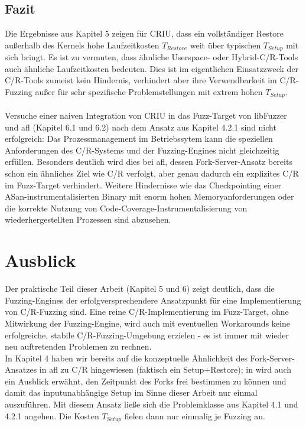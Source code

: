 \documentclass[a4paper]{article}
\begin{document}
\subsection{Fazit}
Die Ergebnisse aus Kapitel 5 zeigen für CRIU, dass ein vollständiger Restore außerhalb des Kernels hohe Laufzeitkosten $T_{Restore}$ weit über typischen $T_{Setup}$ mit sich bringt.
Es ist zu vermuten, dass ähnliche Userspace- oder Hybrid-C/R-Tools auch ähnliche Laufzeitkosten bedeuten.
Dies ist im eigentlichen Einsatzzweck der C/R-Tools zumeist kein Hindernis, verhindert aber ihre Verwendbarkeit im C/R-Fuzzing außer für sehr spezifische Problemstellungen mit extrem hohen $T_{Setup}$.\\ \\
Versuche einer naiven Integration von CRIU in das Fuzz-Target von libFuzzer und afl (Kapitel 6.1 und 6.2) nach dem Ansatz aus Kapitel 4.2.1 sind nicht erfolgreich: Das Prozessmanagement im Betriebssytem kann die speziellen Anforderungen des C/R-Systems und der Fuzzing-Engines nicht gleichzeitig erfüllen.
Besonders deutlich wird dies bei afl, dessen Fork-Server-Ansatz bereits schon ein ähnliches Ziel wie C/R verfolgt, aber genau dadurch ein explizites C/R im Fuzz-Target verhindert.
Weitere Hindernisse wie das Checkpointing einer ASan-instrumentalisierten Binary mit enorm hohen Memoryanforderungen oder die korrekte Nutzung von Code-Coverage-Instrumentalisierung von wiederhergestellten Prozessen sind abzusehen.\\

\section{Ausblick}
Der praktische Teil dieser Arbeit (Kapitel 5 und 6) zeigt deutlich, dass die Fuzzing-Engines der erfolgversprechendere Ansatzpunkt für eine Implementierung von C/R-Fuzzing sind.
Eine reine C/R-Implementierung im Fuzz-Target, ohne Mitwirkung der Fuzzing-Engine, wird auch mit eventuellen Workarounds keine erfolgreiche, stabile C/R-Fuzzing-Umgebung erzielen - es ist immer mit wieder neu auftretenden Problemen zu rechnen.\\
In Kapitel 4 haben wir bereits auf die konzeptuelle Ähnlichkeit des Fork-Server-Ansatzes in afl zu C/R hingewiesen (faktisch ein Setup+Restore); in \cite{aflrestore} wird auch ein Ausblick erwähnt, den Zeitpunkt des Forks frei bestimmen zu können und damit das inputunabhängige Setup im Sinne dieser Arbeit nur einmal auszuführen.
Mit diesem Ansatz ließe sich die Problemklasse aus Kapitel 4.1 und 4.2.1 angehen.
Die Kosten $T_{Setup}$ fielen dann nur einmalig je Fuzzing an.\\
\end{document}
